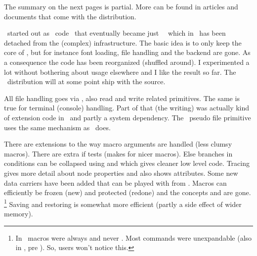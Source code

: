 \stopitemize

\stoptitle

\starttitle[title=The development]

The summary on the next pages is partial. More can be found in articles and
documents that come with the distribution.

\startitemize

\startitem
    \LUATEX\ started out as \CWEB\ code \unknown\ that eventually became just
    \CCODE\ \unknown\ which in \LUAMETATEX\ has been detached from the (complex)
    infrastructure.
\stopitem
\startitem
    The basic idea is to only keep the core of \TEX, but for instance font
    loading, file handling and the backend are gone.
\stopitem
\startitem
    As a consequence the code has been reorganized (shuffled around).
\stopitem
\startitem
    I experimented a lot without bothering about usage elsewhere and I like the
    result so far.
\stopitem
\startitem
    The \CONTEXT\ distribution will at some point ship with the source.
\stopitem

\stopitemize

\starttitle[title=File handling]

\startitemize

\startitem
    All file handling goes via \LUA, also read and write related primitives.
\stopitem
\startitem
    The same is true for terminal (console) handling.
\stopitem
\startitem
    Part of that (the writing) was actually kind of extension code in \TEX\ and
    partly a system dependency.
\stopitem
\startitem
    The \ETEX\ pseudo file \type {\scantokens} primitive uses the same mechanism
    as \LUA\ does.
\stopitem

\stopitemize

\stoptitle

\starttitle[title=The macro machinery]

\startitemize

\startitem
    There are extensions to the way macro arguments are handled (less clumsy
    macros).
\stopitem
\startitem
    There are extra if tests (makes for nicer macros).
\stopitem
\startitem
    Else branches in conditions can be collapsed using \type {\orelse} and \type
    {\orunless} which gives cleaner low level code.
\stopitem
\startitem
    Tracing gives more detail about node properties and also shows attributes.
\stopitem
\startitem
    Some new data carriers have been added that can be played with from \LUA .
\stopitem
\startitem
    Macros can efficiently be frozen (new) and protected (redone) and the
    concepts  and  are gone. \footnote {In \CONTEXT\
    macros were always \type {\long} and never \type {\outer}. Most commands were
    unexpandable (also in \MKII, pre \ETEX). So, users won't notice this.}
\stopitem
\startitem
    Saving and restoring is somewhat more efficient (partly a side effect of
    wider memory).
\stopitem

